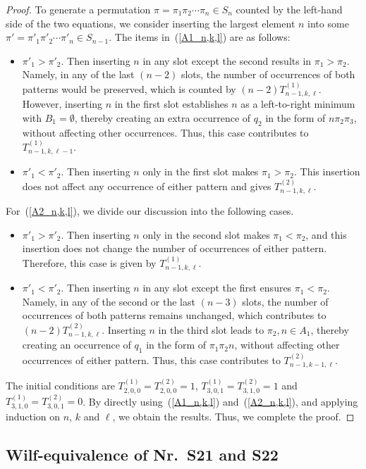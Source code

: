 \documentclass[12pt]{article}
\begin{document}
\begin{proof}
To generate a permutation $\pi=\pi_1\pi_2\cdots \pi_n \in S_n$ counted by the left-hand side of the two equations, we consider inserting the largest element $n$ into some $\pi'=\pi'_1\pi'_2\cdots \pi'_n \in S_{n-1}$. The items in~(\ref{A1_n,k,l}) are as follows:
\begin{itemize}
\item $\pi'_1>\pi'_2$. Then inserting $n$ in any slot except the second results in $\pi_1>\pi_2$. Namely,
in any of the last $(n-2)$ slots, the number of occurrences of both patterns would be preserved, which is counted by $(n-2)T^{(1)}_{n-1,k,\ell}$. However, inserting $n$ in the first slot establishes $n$ as a left-to-right minimum with $B_1=\emptyset$, thereby creating an extra occurrence of $q_2$ in the form of $n\pi_2\pi_3$, without affecting other occurrences. Thus, this case contributes to $T^{(1)}_{n-1,k,\ell-1}$.
\item $\pi'_1<\pi'_2$. Then inserting $n$ only in the first slot makes $\pi_1>\pi_2$. This insertion does not affect any occurrence of either pattern and gives $T^{(2)}_{n-1,k,\ell}$.
 \end{itemize}
 For~(\ref{A2_n,k,l}), we divide our discussion into the following cases.
 \begin{itemize}
\item  $\pi'_1>\pi'_2$. Then inserting $n$ only in the second slot makes $\pi_1<\pi_2$, and this insertion does not change the number of occurrences of either pattern. Therefore, this case is given by $T^{(1)}_{n-1,k,\ell}$.
\item $\pi'_1<\pi'_2$. Then inserting $n$ in any slot except the first ensures $\pi_1<\pi_2$. Namely, in any of the second or the last $(n-3)$ slots, the number of occurrences of both patterns remains unchanged, which contributes to $(n-2)T^{(2)}_{n-1,k,\ell}$.
 Inserting $n$ in the third slot leads to $\pi_2, n \in A_1$, thereby creating an occurrence of $q_1$ in the form of $\pi_1\pi_2n$, without affecting other occurrences of either pattern. Thus, this case contributes to $T^{(2)}_{n-1,k-1,\ell}$.
\end{itemize}  
The initial conditions are $T^{(1)}_{2,0,0}=T^{(2)}_{2,0,0}=1$,  $T^{(1)}_{3,0,1}=T^{(2)}_{3,1,0}=1$ and $T^{(1)}_{3,1,0}=T^{(2)}_{3,0,1}=0$.
 By directly using~(\ref{A1_n,k,l}) and~(\ref{A2_n,k,l}), and applying induction on $n$, $k$ and $\ell$, we obtain the results. Thus, we complete the proof. 
\end{proof}
 
\subsection{Wilf-equivalence of Nr.~S21 and S22}\label{sub-Wilf}
\end{document}
